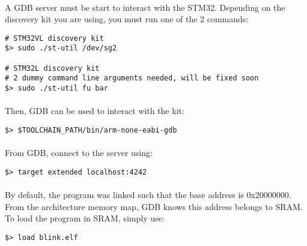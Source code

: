 \documentclass[a4paper, 11pt]{article}
\begin{document}
\paragraph{}
A GDB server must be start to interact with the STM32. Depending on the discovery kit you
are using, you must run one of the 2 commands:\\
\begin{small}
\begin{lstlisting}[frame=tb]
# STM32VL discovery kit
$> sudo ./st-util /dev/sg2

# STM32L discovery kit
# 2 dummy command line arguments needed, will be fixed soon
$> sudo ./st-util fu bar
\end{lstlisting}
\end{small}

\paragraph{}
Then, GDB can be used to interact with the kit:\\
\begin{small}
\begin{lstlisting}[frame=tb]
$> $TOOLCHAIN_PATH/bin/arm-none-eabi-gdb
\end{lstlisting}
\end{small}

\paragraph{}
From GDB, connect to the server using:\\
\begin{small}
\begin{lstlisting}[frame=tb]
$> target extended localhost:4242
\end{lstlisting}
\end{small}

\paragraph{}
By default, the program was linked such that the base address is 0x20000000. From the architecture
memory map, GDB knows this address belongs to SRAM. To load the program in SRAM, simply use:\\
\begin{small}
\begin{lstlisting}[frame=tb]
$> load blink.elf
\end{lstlisting}
\end{small}
\end{document}
